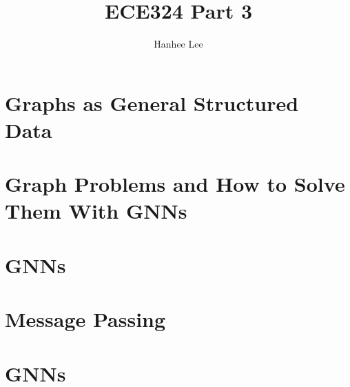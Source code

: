 \documentclass{article}
\title{ECE324 Part 3}
\author{Hanhee Lee}
\begin{document}
\section{Graphs as General Structured Data}

\newpage

\section{Graph Problems and How to Solve Them With GNNs}

\newpage

\section{GNNs}

\newpage

\section{Message Passing}

\newpage

\section{GNNs}

\end{document}
